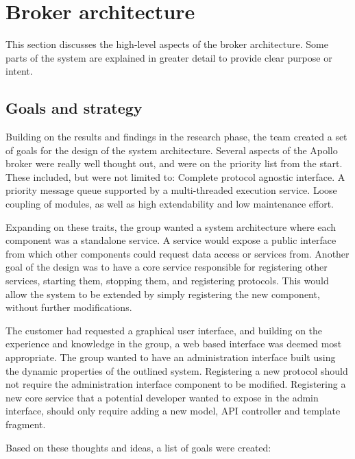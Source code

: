 \section{Broker architecture}
\label{sec:architecture_and_implementation-broker_architecture}

This section discusses the high-level aspects of the broker architecture. Some parts of the system are explained in greater detail to provide clear purpose or intent.

\subsection{Goals and strategy}
\label{subsec:architecture_and_implementation-broker_architecture-goals_and_strategy}

Building on the results and findings in the research phase, the team created a set of goals for the design of the system architecture. Several aspects of the Apollo broker were really well thought out, and were on the priority list from the start. These included, but were not limited to: Complete protocol agnostic interface. A priority message queue supported by a multi-threaded execution service. Loose coupling of modules, as well as high extendability and low maintenance effort.

Expanding on these traits, the group wanted a system architecture where each component was a standalone service. A service would expose a public interface from which other components could request data access or services from. Another goal of the design was to have a core service responsible for registering other services, starting them, stopping them, and registering protocols. This would allow the system to be extended by simply registering the new component, without further modifications.

The customer had requested a graphical user interface, and building on the experience and knowledge in the group, a web based interface was deemed most appropriate. The group wanted to have an administration interface built using the dynamic properties of the outlined system. Registering a new protocol should not require the administration interface component to be modified. Registering a new core service that a potential developer wanted to expose in the admin interface, should only require adding a new model, API controller and template fragment.

Based on these thoughts and ideas, a list of goals were created:


